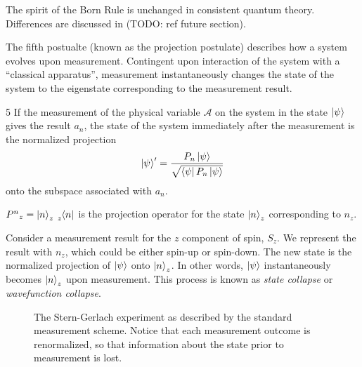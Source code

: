 The spirit of the Born Rule is unchanged in consistent quantum theory. Differences are discussed in (TODO: ref future section).

The fifth postualte (known as the projection postulate) describes how a system evolves upon measurement. Contingent upon interaction of the system with a ``classical apparatus'', measurement instantaneously changes the state of the system to the eigenstate corresponding to the measurement result.

\begin{Thm:Postulate}{5}
    If the measurement of the physical variable $\mathcal{A}$ on the system in the state $\ket{\psi}$ gives the result $a_n$, the state of the system immediately after the measurement is the normalized projection
    \begin{align}
        \ket{\psi}^\prime = \frac{P_n\ket{\psi}}{\sqrt{\bra{\psi}P_n\ket{\psi}
        }}
    \end{align}
    onto the subspace associated with $a_n$.
\end{Thm:Postulate}

${P^n}_z = \ket{n}_z\tensor[_z]{\bra{n}}{}$ is the projection operator for the state $\ket{n}_z$ corresponding to $n_z$.

Consider a measurement result for the $z$ component of spin, $S_z$. We represent the result with $n_z$, which could be either spin-up or spin-down. The new state is the normalized projection of $\ket{\psi}$ onto $\ket{n}_z$. In other words, $\ket{\psi}$ instantaneously becomes $\ket{n}_z$ upon measurement. This process is known as \textit{state collapse} or \textit{wavefunction collapse}.

\begin{figure}
\centering\CaptionFontSize
{}
\caption[Insert an abbreviated caption here to show in the List of Figures]
{The Stern-Gerlach experiment as described by the standard measurement scheme. Notice that each measurement
outcome is renormalized, so that information about the state prior to measurement is lost.}
\label{Figure:Measurement:Renormalizing}
\end{figure}

